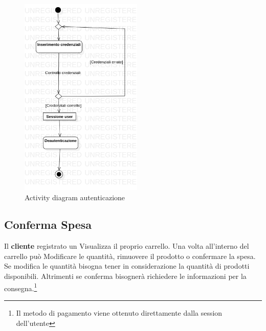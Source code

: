 \documentclass[12pt, a4paper]{report}
\begin{document}
\begin{figure}[h]
  \centering
  \includegraphics[width=0.52\textwidth]{Use Case Model!Autenticazione!ActivityAutenticazione!ActivityDiagramAutenticazione_8.png}
  \caption{Activity diagram autenticazione}
\end{figure}

\newpage

\subsection{Conferma Spesa}

Il \textbf{cliente} registrato un Visualizza il proprio carrello. Una volta
all'interno del carrello può Modificare le quantità, rimuovere il prodotto o
confermare la spesa. Se modifica le quantità bisogna tener in considerazione la
quantità di prodotti disponibili. Altrimenti se conferma bisognerà richiedere
le informazioni per la consegna.\footnote{Il metodo di pagamento viene
ottenuto direttamente dalla session dell'utente}
\end{document}

